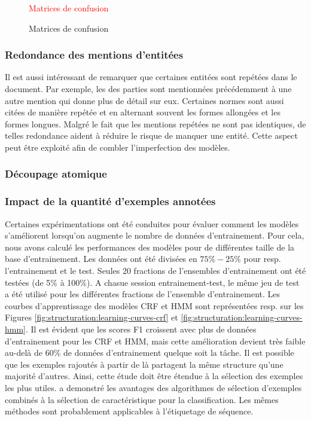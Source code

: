 \begin{figure}[h!]
    \centering
    \textcolor{red}{Matrices de confusion}
    \caption{Matrices de confusion}
    \label{fig:structuration:matrices-confusions}
\end{figure}

\subsubsection{Redondance des mentions d'entitées}
Il est aussi intéressant de remarquer que certaines entitées sont repétées dans le document. Par exemple, les des parties sont mentionnées précédemment à une autre mention qui donne plus de détail sur eux. Certaines normes sont aussi citées de manière repétée et en alternant souvent les formes allongées et les formes longues. Malgré le fait que les mentions repétées ne sont pas identiques, de telles redondance aident à réduire le risque de manquer une entité. Cette aspect peut être exploité afin de combler l'imperfection des modèles.

\subsubsection{Découpage atomique}

\subsubsection{Impact de la quantité d'exemples annotées}
Certaines expérimentations ont été conduites pour évaluer comment les modèles s'améliorent lorsqu'on augmente le nombre de données d'entrainement. Pour cela, nous avons calculé les performances des modèles pour de différentes taille de la base d'entrainement. Les données ont été divisées en $75\%-25\%$ pour resp. l'entrainement et le test. Seules 20 fractions de l'ensembles d'entrainement ont été testées (de 5\% à 100\%). A chasue session entrainement-test, le même jeu de test a été utilisé pour les différentes fractions de l'ensemble d'entrainement. Les courbes d'apprentissage des modèles CRF et HMM sont représentées resp. sur les Figures \ref{fig:structuration:learning-curves-crf} et \ref{fig:structuration:learning-curves-hmm}. Il est évident que les scores F1 croissent avec plus de données d'entrainement pour les CRF et HMM, mais cette amélioration devient très faible au-delà de 60\% de données d'entrainement quelque soit la tâche. Il est possible que les exemples rajoutés à partir de là partagent la même structure qu'une majorité d'autres. Ainsi, cette étude doit être étendue à la sélection des exemples les plus utiles. \citet{raman2003exampleSelection} a demonstré les avantages des algorithmes de sélection d'exemples combinés à la sélection de caractéristique pour la classification. Les mêmes méthodes sont probablement applicables à l'étiquetage de séquence.

